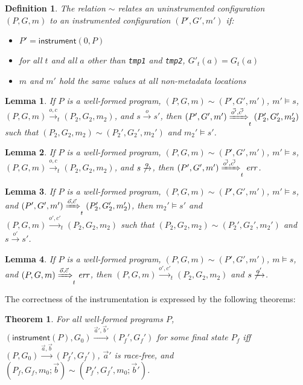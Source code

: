 \documentclass[preprint, 10pt]{sigplanconf}
\newcommand{\instr}[2]{\ensuremath{\mathsf{instrument}(#1, #2)}}
\newcommand{\instrp}[1]{\ensuremath{\mathsf{instrument}(#1)}}
\newtheorem{lemma}{Lemma}
\newtheorem{theorem}{Theorem}
\newtheorem{definition}{Definition}
\begin{document}
\begin{definition}The relation $\sim$ relates an uninstrumented configuration $(P, G, m)$ to an instrumented configuration $(P', G', m')$ if:
\begin{itemize}
\item $P' = \instr{0}{P}$
\item for all $t$ and all $a$ other than \texttt{tmp1} and \texttt{tmp2}, $G'_t(a) = G_t(a)$
\item $m$ and $m'$ hold the same values at all non-metadata locations
\end{itemize}
\end{definition}
\begin{lemma}If $P$ is a well-formed program, $(P, G, m) \sim (P', G', m')$, $m' \models s$, $(P, G, m) \xrightarrow{o, c}_t (P_2, G_2, m_2)$, and $s \xrightarrow{o} s'$, then $(P', G', m') \xRightarrow{\vec{o'}, \vec{c'}}_t (P_2', G_2', m_2')$ such that $(P_2, G_2, m_2) \sim (P_2', G_2', m_2')$ and $m_2' \models s'$.\end{lemma}
\begin{lemma}If $P$ is a well-formed program, $(P, G, m) \sim (P', G', m')$, $m' \models s$, $(P, G, m) \xrightarrow{o, c}_t (P_2, G_2, m_2)$, and $s \not\xrightarrow{o}$, then $(P', G', m') \xRightarrow{\vec{o'}, \vec{c'}}_t \mathit{err}$.\end{lemma}
\begin{lemma}If $P$ is a well-formed program, $(P, G, m) \sim (P', G', m')$, $m' \models s$, and $(P', G', m') \xRightarrow{\vec{o}, \vec{c}}_t (P_2', G_2', m_2')$, then $m_2' \models s'$ and $(P, G, m) \xrightarrow{o', c'}_t (P_2, G_2, m_2)$ such that $(P_2, G_2, m_2) \sim (P_2', G_2', m_2')$ and $s \xrightarrow{o'} s'$.\end{lemma}
\begin{lemma}If $P$ is a well-formed program, $(P, G, m) \sim (P', G', m')$, $m \models s$, and $(P, G, m) \xRightarrow{\vec{o}, \vec{c}}_t \mathit{err}$, then $(P, G, m) \xrightarrow{o', c'}_t (P_2, G_2, m_2)$ and $s \not\xrightarrow{o'}$.\end{lemma}

The correctness of the instrumentation is expressed by the following theorems:
\begin{theorem}\label{safe}For all well-formed programs $P$, $(\instrp{P}, G_0) \xrightarrow{\vec{a}', \vec{b}'} (P_f', G_f')$ for some final state $P_f$ iff $(P, G_0) \xrightarrow{\vec{a}, \vec{b}} (P_f', G_f')$, $\vec{a}'$ is race-free, and $(P_f, G_f, m_0; \vec{b}) \sim (P_f', G_f', m_0; \vec{b}')$.\end{theorem}
\end{document}
